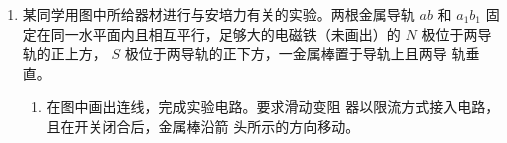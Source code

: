 \begin{enumerate}
\begin{enumerate}
\end{enumerate}




\item 
{}
某同学用图中所给器材进行与安培力有关的实验。两根金属导轨
$ ab $ 和 $ a_{1} b_{1} $ 固定在同一水平面内且相互平行，足够大的电磁铁（未画出）的 $ N $ 极位于两导轨的正上方，
$ S $ 极位于两导轨的正下方，一金属棒置于导轨上且两导
轨垂直。
\begin{figure}[h!]
\centering

\end{figure}

\begin{enumerate}
\item
在图中画出连线，完成实验电路。要求滑动变阻
器以限流方式接入电路，且在开关闭合后，金属棒沿箭
头所示的方向移动。



\end{enumerate}
\end{enumerate}
